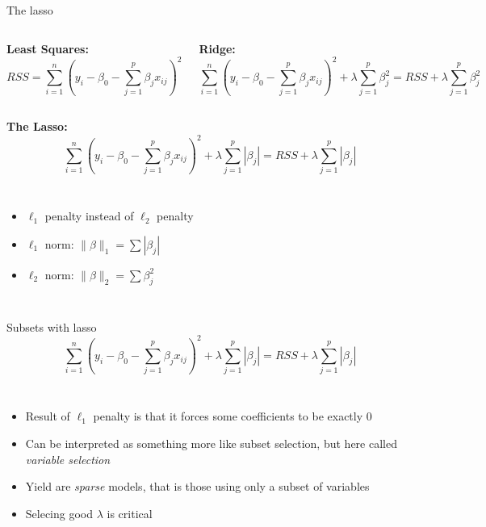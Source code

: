\documentclass[aspectratio=169,usenames,dvipsnames]{beamer}
\newcommand{\InstructorList}[1]{
\begin{itemize}
	\color{orange}
	#1
\end{itemize}
}
\begin{document}
\begin{frame}[t]{The lasso}

\begin{columns}
\centering
\textbf{Least Squares:}
\footnotesize
\begin{equation*}
	RSS = \sum_{i=1}^n \left(y_i - \beta_0 - \sum_{j=1}^p \beta_j x_{ij}\right)^2
\end{equation*}

\centering
\footnotesize
\textbf{Ridge:}
\begin{equation*}
	\sum_{i=1}^n \left(y_i - \beta_0 - \sum_{j=1}^p \beta_j x_{ij}\right)^2 + \lambda \sum_{j=1}^p \beta_j^2 = RSS + \lambda \sum_{j=1}^p \beta_j^2
\end{equation*}

\end{columns}
\centering
\qquad

\textbf{The Lasso:}
\begin{equation*}
	\sum_{i=1}^n \left(y_i - \beta_0 - \sum_{j=1}^p \beta_j x_{ij}\right)^2
		+ \lambda \sum_{j=1}^p |\beta_j|
	= RSS + \lambda \sum_{j=1}^p |\beta_j|
\end{equation*}

\begin{columns}
\centering
\footnotesize
\InstructorList{
\item $\ell_1$ penalty instead of $\ell_2$ penalty
\item $\ell_1$ norm: $\|\beta \|_1 = \sum |\beta_j|$
\item $\ell_2$ norm: $\|\beta \|_2 = \sum \beta_j^2$
}
\centering

\footnotesize

\end{columns}

\end{frame}
\begin{frame}[t]{Subsets with lasso}
	\begin{equation*}
		\sum_{i=1}^n \left(y_i - \beta_0 - \sum_{j=1}^p \beta_j x_{ij}\right)^2
			+ \lambda \sum_{j=1}^p |\beta_j|
		= RSS + \lambda \sum_{j=1}^p |\beta_j|
	\end{equation*}
\begin{columns}
\centering
\InstructorList{
\item Result of $\ell_1$ penalty is that it forces some coefficients to be exactly 0
\item Can be interpreted as something more like subset selection, but here called \textit{variable selection}
\item Yield are \textit{sparse} models, that is those using only a subset of variables
\item Selecing good $\lambda$ is critical
}
\centering

\end{columns}

\end{frame}
\end{document}
